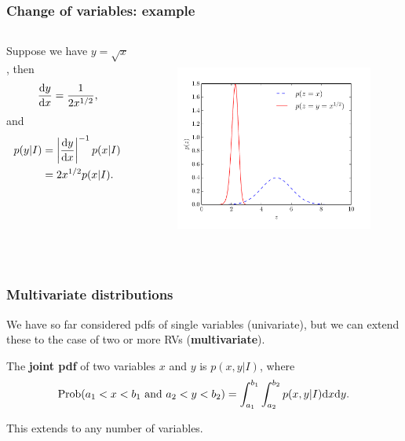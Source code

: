 \begin{frame}

\frametitle{Change of variables: example}
\label{changeofvariables:example}

\begin{columns}
\begin{column}{0.3\textwidth}
Suppose we have $y = \sqrt{x}$, then
\[
\frac{{\rm d}y}{{\rm d}x} = \frac{1}{2x^{1/2}},
\]
and
\begin{align*}
p(y|I) &= \left|\frac{{\rm d}y}{{\rm d} x}\right|^{-1} p(x|I) \\
&= 2x^{1/2}p(x|I).
\end{align*}
\end{column}

\begin{column}{0.7\textwidth}

\begin{figure}[htbp]
\centering
\includegraphics[keepaspectratio,width=\textwidth,height=200pt]{figures/change_of_variables_1d.pdf}
\label{change_of_variables_1d}
\end{figure}

\end{column}
\end{columns}

\end{frame}

\begin{frame}

\frametitle{Multivariate distributions}
\label{multivariatedistributions}

We have so far considered pdfs of single variables (univariate), but we can extend these to the case of
two or more RVs (\textbf{multivariate}).

The \textbf{joint pdf} of two variables $x$ and $y$ is $p(x,y|I)$, where
\[
\text{Prob}(a_1 < x < b_1~\text{and}~a_2 < y < b_2) = \int_{a_1}^{b_1}\int_{a_2}^{b_2} p(x,y|I) {\rm d}x {\rm d}y. 
\]

This extends to any number of variables.

\end{frame}

